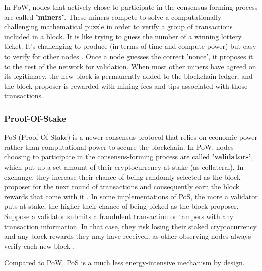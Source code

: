 In PoW, nodes that actively chose to participate in the consensus-forming process are called \textbf{'miners'}. These miners compete 
to solve a computationally challenging mathematical puzzle in order to verify a group of transactions included in a block. 
It is like trying to guess the number of a winning lottery ticket. It's challenging to produce (in terms of time and compute power) but easy to verify for other nodes \cite{Centieiro2021BitcoinCoding}. Once a node guesses the correct 'nonce', it proposes it to the rest of the network for validation. When most other miners have agreed on its legitimacy, the new block is permanently added to the blockchain ledger, and the block proposer is rewarded with mining fees and tips associated with those transactions.


\subsubsection{Proof-Of-Stake}

PoS (Proof-Of-Stake) is a newer consensus protocol that relies on economic power rather than computational power to secure the blockchain. In PoW, nodes choosing to participate in the consensus-forming process are called \textbf{'validators'}, which put up a set amount of their cryptocurrency at stake (as collateral). In exchange, they increase their chance of being randomly selected as the block proposer for the next round of transactions and consequently earn the block rewards that come with it \cite{King2012PPCoin:Proof-of-Stake}. In some implementations of PoS, the more a validator puts at stake, the higher their chance of being picked as the block proposer. Suppose a validator submits a fraudulent transaction or tampers with any transaction information. In that case, they risk losing their staked cryptocurrency and any block rewards they may have received, as other observing nodes always verify each new block \cite{Napoletano2022WhatAdvisor}. 

Compared to PoW, PoS is a much less energy-intensive mechanism by design.


